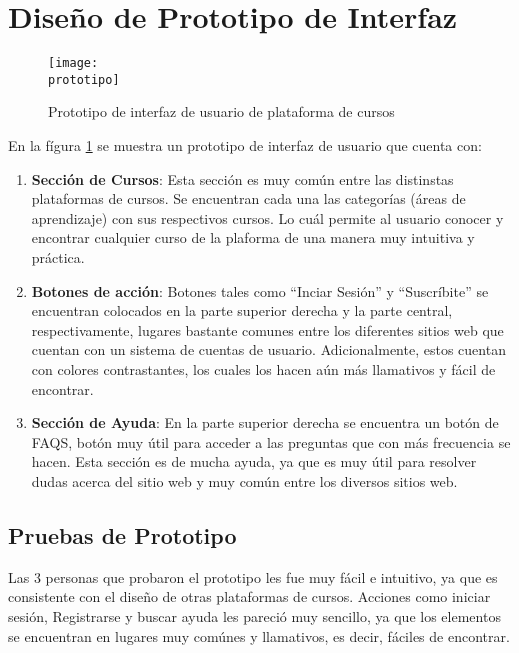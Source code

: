 	\clearpage
	\section{Diseño de Prototipo de Interfaz}

	\begin{figure}[h]
		\centering
		\texttt{[image: \\prototipo]}
		\caption{Prototipo de interfaz de usuario de plataforma de cursos}
		\label{fig:prototipo}
	\end{figure}

	En la fígura \ref{fig:prototipo} se muestra un prototipo de interfaz de usuario que cuenta con:

	\begin{enumerate}
		\item \textbf{Sección de Cursos}: Esta sección es muy común entre las distinstas plataformas de cursos. Se encuentran cada una las categorías (áreas de aprendizaje) con sus respectivos cursos. Lo cuál permite al usuario conocer y encontrar cualquier curso de la plaforma de una manera muy intuitiva y práctica.

		\item \textbf{Botones de acción}: Botones tales como ``Inciar Sesión'' y ``Suscríbite'' se encuentran colocados en la parte superior derecha y la parte central, respectivamente, lugares bastante comunes entre los diferentes sitios web que cuentan con un sistema de cuentas de usuario. Adicionalmente, estos cuentan con colores contrastantes, los cuales los hacen aún más llamativos y fácil de encontrar.

		\item \textbf{Sección de Ayuda}: En la parte superior derecha se encuentra un botón de FAQS, botón muy útil para acceder a las preguntas que con más frecuencia se hacen. Esta sección es de mucha ayuda, ya que es muy útil para resolver dudas acerca del sitio web y muy común entre los diversos sitios web.
	\end{enumerate}

	\subsection{Pruebas de Prototipo}

	Las 3 personas que probaron el prototipo les fue muy fácil e intuitivo, ya que es consistente con el diseño de otras plataformas de cursos. Acciones como iniciar sesión, Registrarse y buscar ayuda les pareció muy sencillo, ya que los elementos se encuentran en lugares muy comúnes y llamativos, es decir, fáciles de encontrar.


	\nocite{*} %

	\clearpage
	

	


